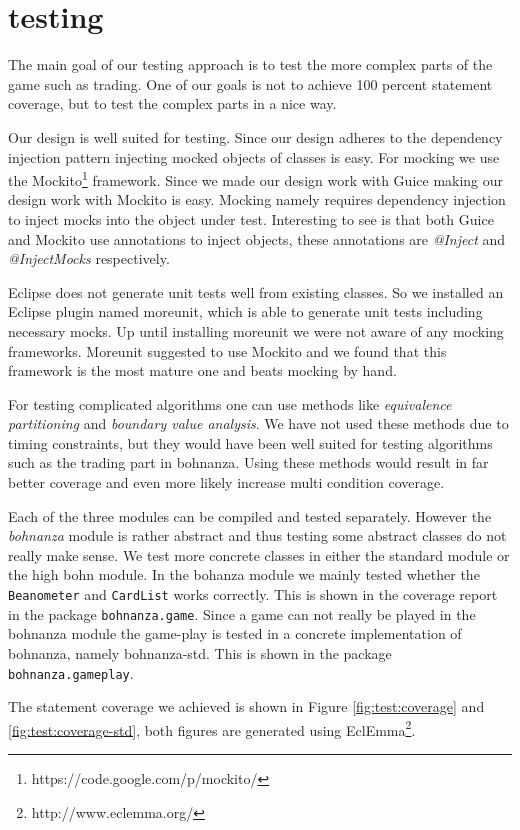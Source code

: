 \section{testing}
The main goal of our testing approach is to test the more complex parts of the game such as
trading. One of our goals is not to achieve 100 percent statement coverage, but to test the complex parts
in a nice way.

Our design is well suited for testing.
Since our design adheres to the dependency injection pattern injecting mocked objects of classes is easy. For mocking we use the
Mockito\footnote{https://code.google.com/p/mockito/} framework. Since we made our design work with Guice making our design work with
Mockito is easy. Mocking namely requires dependency injection to inject mocks into the object under test. Interesting to see is that both
Guice and Mockito use annotations to inject objects, these annotations are \emph{@Inject} and \emph{@InjectMocks} respectively.

Eclipse does not generate unit tests well from existing classes. So we installed an
Eclipse plugin named moreunit, which is able to generate unit tests including necessary mocks. Up until installing moreunit we were not
aware of any mocking frameworks. Moreunit suggested to use Mockito and we found that this framework is the most mature one and beats
mocking by hand.

For testing complicated algorithms one can use methods like \emph{equivalence partitioning} and \emph{boundary value analysis}. We have not
used these methods due to timing constraints, but they would have been well suited for testing algorithms such as the trading part in
bohnanza. Using these methods would result in far better coverage and even more likely increase multi condition coverage.

Each of the three modules can be compiled and tested separately.
However the \emph{bohnanza} module is rather abstract and thus testing some abstract classes do not really make sense. We test
more concrete classes in either the standard module or the high bohn module.
In the bohanza module we mainly tested whether the \texttt{Beanometer} and \texttt{CardList}
works correctly. This is shown in the coverage report in the package \texttt{bohnanza.game}. Since a
game can not really be played in the bohnanza module the game-play is tested in a concrete
implementation of bohnanza, namely bohnanza-std. This is shown in the package
\texttt{bohnanza.gameplay}. 

The statement coverage we achieved is shown in Figure \ref{fig:test:coverage} and \ref{fig:test:coverage-std}, both figures
are generated using EclEmma\footnote{http://www.eclemma.org/}.

